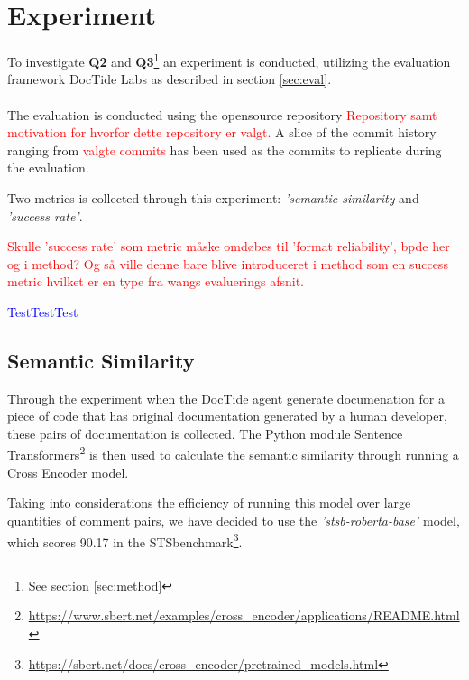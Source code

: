 \section{Experiment}
\label{sec:exp}
To investigate \textbf{Q2} and \textbf{Q3}\footnote{See section \ref{sec:method}} an experiment is conducted, utilizing the evaluation framework DocTide Labs as described in section \ref{sec:eval}. 
\\ \\
The evaluation is conducted using the opensource repository \textcolor{red}{Repository samt motivation for hvorfor dette repository er valgt.} A slice of the commit history ranging from \textcolor{red}{valgte commits} has been used as the commits to replicate during the evaluation.

Two metrics is collected through this experiment: \textit{'semantic similarity} and \textit{'success rate'}.

\textcolor{red}{Skulle 'success rate' som metric måske omdøbes til 'format reliability', bpde her og i method? Og så ville denne bare blive introduceret i method som en success metric hvilket er en type fra wangs evaluerings afsnit.}

\textcolor{blue}{TestTestTest}


\subsection{Semantic Similarity}
Through the experiment when the DocTide agent generate documenation for a piece of code that has original documentation generated by a human developer, these pairs of documentation is collected. The Python module Sentence Transformers\footnote{\url{https://www.sbert.net/examples/cross_encoder/applications/README.html}} is then used to calculate the semantic similarity through running a Cross Encoder model.

Taking into considerations the efficiency of running this model over large quantities of comment pairs, we have decided to use the \textit{'stsb-roberta-base'} model, which scores 90.17 in the STSbenchmark\footnote{\url{https://sbert.net/docs/cross_encoder/pretrained_models.html}}.
